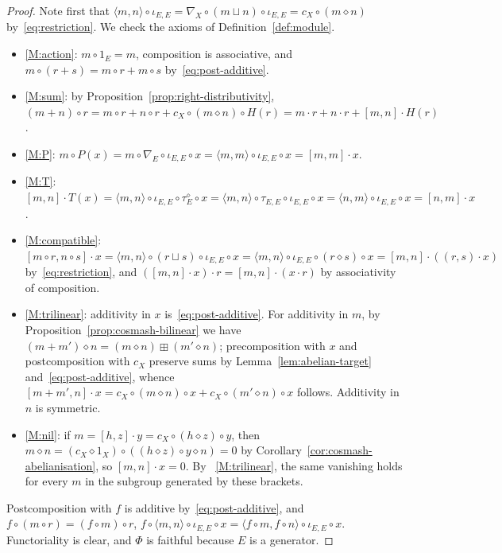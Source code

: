 \documentclass[reqno,a4paper]{amsart}
\theoremstyle{plain}
\theoremstyle{definition}
\newcommand{\cosmash}{\ensuremath{\diamond}}
\newcommand{\cosum}{\ensuremath{\sqcup}}                   %
\newcommand{\cc}[1]{\ensuremath{c_{#1}}}                    %
\newcommand{\tw}[2]{\ensuremath{\tau_{#1,#2}}}             %
\newcommand{\swc}[1]{\ensuremath{\tau^{\cosmash}_{#1}}}          %
\newcommand{\fold}[1]{\ensuremath{\nabla_{#1}}}            %
\newcommand{\brk}[2]{\ensuremath{[#1,#2]}}
\begin{document}
\begin{proof}
  Note first that \(\langle m,n\rangle\circ\iota_{E,E}=\fold{X}\circ(m\cosum n)\circ\iota_{E,E}=\cc{X}\circ(m\cosmash n)\) by~\eqref{eq:restriction}. We check the axioms of Definition~\ref{def:module}.
  \begin{itemize}
    \item \ref{M:action}: \(m\circ 1_{E}=m\), composition is associative, and \(m\circ(r+s)=m\circ r+m\circ s\) by~\eqref{eq:post-additive}.
    \item \ref{M:sum}: by Proposition~\ref{prop:right-distributivity}, \((m+n)\circ r=m\circ r+n\circ r+\cc{X}\circ(m\cosmash n)\circ H(r)=m\cdot r+n\cdot r+\brk{m}{n}\cdot H(r)\).
    \item \ref{M:P}: \(m\circ P(x)=m\circ\fold{E}\circ\iota_{E,E}\circ x=\langle m,m\rangle\circ\iota_{E,E}\circ x=\brk{m}{m}\cdot x\).
    \item \ref{M:T}: \(\brk{m}{n}\cdot T(x)=\langle m,n\rangle\circ\iota_{E,E}\circ\swc{E}\circ x=\langle m,n\rangle\circ\tw{E}{E}\circ\iota_{E,E}\circ x=\langle n,m\rangle\circ\iota_{E,E}\circ x=\brk{n}{m}\cdot x\).
    \item \ref{M:compatible}: \(\brk{m\circ r}{n\circ s}\cdot x=\langle m,n\rangle\circ(r\cosum s)\circ\iota_{E,E}\circ x=\langle m,n\rangle\circ\iota_{E,E}\circ(r\cosmash s)\circ x=\brk{m}{n}\cdot((r,s)\cdot x)\) by~\eqref{eq:restriction}, and \((\brk{m}{n}\cdot x)\cdot r=\brk{m}{n}\cdot(x\cdot r)\) by associativity of composition.
    \item \ref{M:trilinear}: additivity in \(x\) is~\eqref{eq:post-additive}. For additivity in \(m\), by Proposition~\ref{prop:cosmash-bilinear} we have \((m+m')\cosmash n=(m\cosmash n)\boxplus (m'\cosmash n)\); precomposition with \(x\) and postcomposition with \(\cc{X}\) preserve sums by Lemma~\ref{lem:abelian-target} and~\eqref{eq:post-additive}, whence \(\brk{m+m'}{n}\cdot x=\cc{X}\circ(m\cosmash n)\circ x+\cc{X}\circ(m'\cosmash n)\circ x\) follows. Additivity in \(n\) is symmetric.
    \item \ref{M:nil}: if \(m=\brk{h}{z}\cdot y=\cc{X}\circ(h\cosmash z)\circ y\), then \(m\cosmash n=(\cc{X}\cosmash 1_{X})\circ((h\cosmash z)\circ y\cosmash n)=0\) by Corollary~\ref{cor:cosmash-abelianisation}, so \(\brk{m}{n}\cdot x=0\). By ~\ref{M:trilinear}, the same vanishing holds for every \(m\) in the subgroup generated by these brackets.
  \end{itemize}
  Postcomposition with \(f\) is additive by~\eqref{eq:post-additive}, and \(f\circ(m\circ r)=(f\circ m)\circ r\), \(f\circ\langle m,n\rangle\circ\iota_{E,E}\circ x=\langle f\circ m,f\circ n\rangle\circ\iota_{E,E}\circ x\). Functoriality is clear, and \(\Phi\) is faithful because \(E\) is a generator.
\end{proof}
\end{document}
